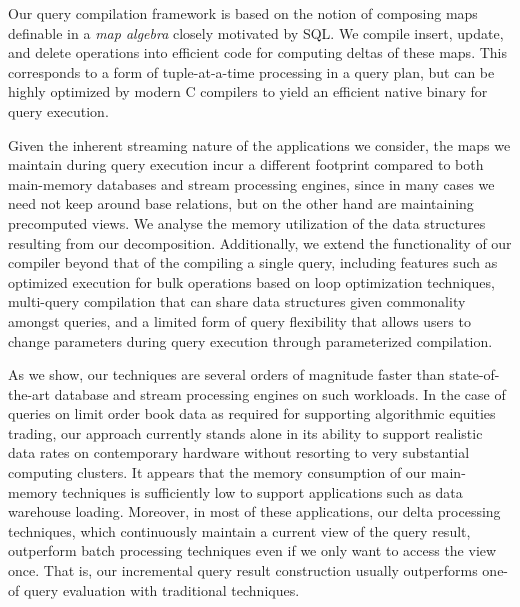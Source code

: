 \medskip







Our query compilation framework is based on the notion of composing maps
definable in a {\em map algebra}\/ closely motivated by SQL.
We compile insert, update, and delete operations into efficient code for computing
deltas of these maps. This corresponds to a form of
tuple-at-a-time processing in a query plan, but can be highly optimized by
modern C compilers to yield an efficient native binary for query execution.

Given the inherent streaming nature of the applications we consider, the maps we
maintain during query execution incur a different footprint compared to both
main-memory databases and stream processing engines, since in many cases we need
not keep around base relations, but on the other hand are maintaining precomputed
views. We analyse the memory utilization of the data structures resulting from
our decomposition. Additionally, we extend the functionality of our compiler
beyond that of the compiling a single query, including features such as optimized
execution for bulk operations based on loop optimization techniques, multi-query
compilation that can share data structures given commonality amongst queries, and
a limited form of query flexibility that allows users to change parameters during
query execution through parameterized compilation.


As we  show, our techniques are several orders
of  magnitude   faster  than  state-of-the-art   database  and  stream
processing engines on such workloads.  In the case of queries on limit
order  book  data  as  required for  supporting  algorithmic  equities
trading, our approach currently stands alone in its ability to support
realistic  data rates  on contemporary  hardware without  resorting to
very substantial computing clusters.
It appears that the memory consumption of our main-memory techniques
is sufficiently low to support applications such as data warehouse loading.
Moreover, in most of these applications, our delta processing techniques,
which continuously maintain a current view of the query result, outperform
batch processing techniques even if we only want to access the
view once. That is, our incremental query result construction usually
outperforms one-of query evaluation with traditional techniques.





